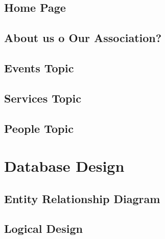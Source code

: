 \documentclass[11pt, a4paperm, hidelinks]{article}
\begin{document}
	\subsection{Home Page}
	
	\clearpage

	\subsection{About us o Our Association?}
	
	\clearpage

	\subsection{Events Topic}
	
	\clearpage

	\subsection{Services Topic}
	
	\clearpage

	\subsection{People Topic}
	
	\clearpage

	\section{Database Design}	

	\subsection{Entity Relationship Diagram}

	\subsection{Logical Design}
	\clearpage
\end{document}
